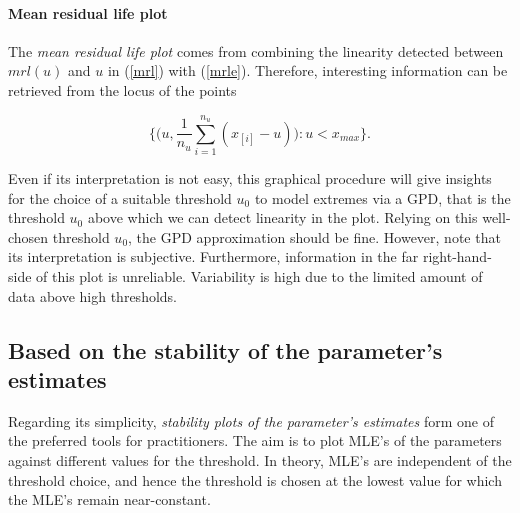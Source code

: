 \paragraph*{Mean residual life plot} 
The \emph{mean residual life plot} comes from combining the linearity detected between $mrl(u)$ and $u$ in (\ref{mrl}) with (\ref{mrle}). Therefore, interesting information can be retrieved from the locus of the points 

\begin{equation}
\Bigg\{\bigg(u,\frac{1}{n_u}\sum_{i=1}^{n_u}(x_{[i]}-u)\bigg):u<x_{max}\Bigg\}.
\end{equation}

Even if its interpretation is not easy, this graphical procedure will give insights for the choice of a suitable threshold $u_0$ to model extremes via a GPD, that is the threshold $u_0$ above which we can detect linearity in the plot. Relying on this well-chosen threshold $u_0$, the GPD approximation should be fine.
However, note that its interpretation is subjective. Furthermore, information in the far right-hand-side of this plot is unreliable. Variability is high due to the limited amount of data above high thresholds. %



\subsection*{Based on the stability of the parameter's estimates}


Regarding its simplicity,  \textit{stability plots of the parameter's estimates} form one of the preferred tools for practitioners.
The aim is to plot MLE's of the parameters against different values for the threshold. In theory, MLE's are independent of the threshold choice, and hence the threshold is chosen at the lowest value for which the MLE's remain near-constant. 

